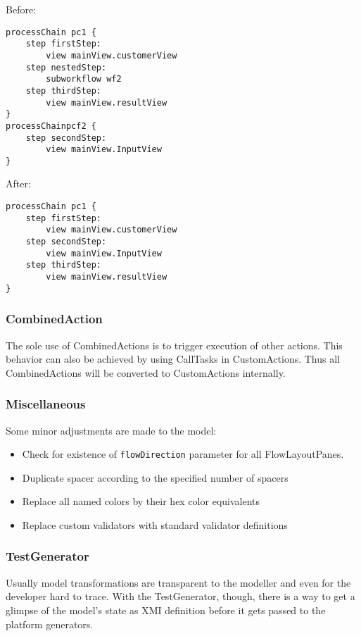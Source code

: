 Before:

\begin{lstlisting}[language=MD2]
processChain pc1 {
	step firstStep:
		view mainView.customerView
	step nestedStep:
		subworkflow wf2
	step thirdStep:
		view mainView.resultView
}
processChainpcf2 {
	step secondStep:
		view mainView.InputView
}
\end{lstlisting}

After:

\begin{lstlisting}[language=MD2]
processChain pc1 {
	step firstStep:
		view mainView.customerView
	step secondStep:
		view mainView.InputView
	step thirdStep:
		view mainView.resultView
}

\end{lstlisting}

\subsubsection{CombinedAction}
The sole use of CombinedActions is to trigger execution of other actions. This behavior can also be achieved by using CallTasks in CustomActions. Thus all CombinedActions will be converted to CustomActions internally.

\subsubsection{Miscellaneous}
Some minor adjustments are made to the model:

\begin{itemize}
\item Check for existence of \lstinline!flowDirection! parameter for all FlowLayoutPanes.
\item Duplicate spacer according to the specified number of spacers
\item Replace all named colors by their hex color equivalents
\item Replace custom validators with standard validator definitions
\end{itemize}

\subsubsection{TestGenerator}
Usually model transformations are transparent to the modeller and even for the developer hard to trace. With the TestGenerator, though, there is a way to get a glimpse of the model’s state as XMI definition before it gets passed to the platform generators.